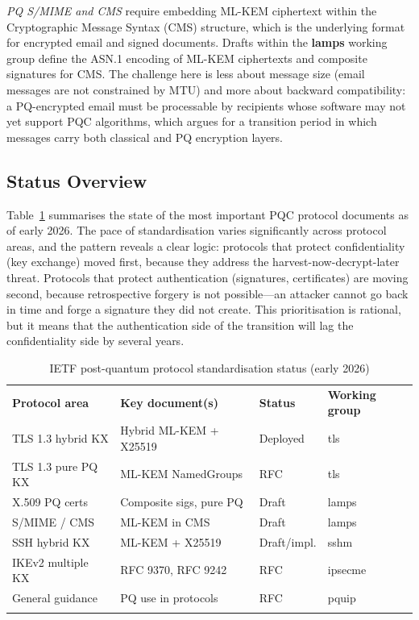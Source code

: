 \emph{PQ S/MIME and CMS} require embedding ML-KEM ciphertext within the Cryptographic Message Syntax (CMS) structure, which is the underlying format for encrypted email and signed documents. Drafts within the \textbf{lamps} working group define the ASN.1 encoding of ML-KEM ciphertexts and composite signatures for CMS. The challenge here is less about message size (email messages are not constrained by MTU) and more about backward compatibility: a PQ-encrypted email must be processable by recipients whose software may not yet support PQC algorithms, which argues for a transition period in which messages carry both classical and PQ encryption layers.

\subsection{Status Overview}
\label{subsec:ietf-status}

Table~\ref{tab:ietf-status} summarises the state of the most important PQC protocol documents as of early 2026. The pace of standardisation varies significantly across protocol areas, and the pattern reveals a clear logic: protocols that protect confidentiality (key exchange) moved first, because they address the harvest-now-decrypt-later threat. Protocols that protect authentication (signatures, certificates) are moving second, because retrospective forgery is not possible---an attacker cannot go back in time and forge a signature they did not create. This prioritisation is rational, but it means that the authentication side of the transition will lag the confidentiality side by several years.

\begin{table}[t]
\caption{IETF post-quantum protocol standardisation status (early 2026)}
\label{tab:ietf-status}
\begin{tabular}{p{3.2cm}p{3.8cm}p{2cm}p{2.5cm}}
\hline\noalign{\smallskip}
\textbf{Protocol area} & \textbf{Key document(s)} & \textbf{Status} & \textbf{Working group} \\
\noalign{\smallskip}\svhline\noalign{\smallskip}
TLS 1.3 hybrid KX & Hybrid ML-KEM + X25519 & Deployed & tls \\
TLS 1.3 pure PQ KX & ML-KEM NamedGroups & RFC & tls \\
X.509 PQ certs & Composite sigs, pure PQ & Draft & lamps \\
S/MIME / CMS & ML-KEM in CMS & Draft & lamps \\
SSH hybrid KX & ML-KEM + X25519 & Draft/impl. & sshm \\
IKEv2 multiple KX & RFC 9370, RFC 9242 & RFC & ipsecme \\
General guidance & PQ use in protocols & RFC & pquip \\
\noalign{\smallskip}\hline
\end{tabular}
\end{table}

